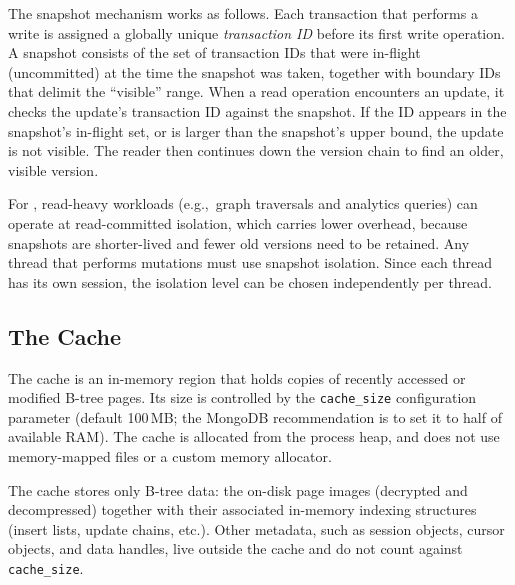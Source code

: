 The snapshot mechanism works as follows.
Each transaction that performs a write is assigned a globally unique \emph{transaction ID} before its first write operation.
A snapshot consists of the set of transaction IDs that were in-flight (uncommitted) at the time the snapshot was taken, together with boundary IDs that delimit the ``visible'' range.
When a read operation encounters an update, it checks the update's transaction ID against the snapshot.
If the ID appears in the snapshot's in-flight set, or is larger than the snapshot's upper bound, the update is not visible.
The reader then continues down the version chain to find an older, visible version.


For \project{}, read-heavy workloads (e.g.,\ graph traversals and analytics queries) can operate at read-committed isolation, which carries lower overhead, because snapshots are shorter-lived and fewer old versions need to be retained.
Any thread that performs mutations must use snapshot isolation.
Since each thread has its own session, the isolation level can be chosen independently per thread.

\subsection{The \wt{} Cache}
\label{sec:wt-cache}

The \wt{} cache is an in-memory region that holds copies of recently
accessed or modified B-tree pages.
Its size is controlled by the \texttt{cache\_size} configuration parameter (default 100\,MB; the MongoDB recommendation is to set it to half of available RAM).
The cache is allocated from the process heap, and \wt{} does not use memory-mapped files or a custom memory allocator.

The cache stores only B-tree data: the on-disk page images (decrypted and
decompressed) together with their associated in-memory indexing structures
(insert lists, update chains, etc.).
Other \wt{} metadata, such as session objects, cursor objects, and data handles,  live outside the cache and do not count against \texttt{cache\_size}.

